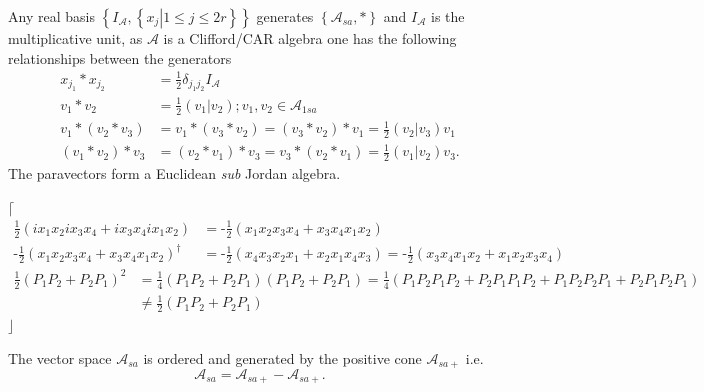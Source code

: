\documentclass[aps, preprint]{revtex4}
\begin{document}
Any real basis $\left \{I_{\mathcal{A}} ,\left \{\left .x_{j}\right \vert 1 \leq j \leq 2 r\right \}\right \}$ generates $\left \{\mathcal{A}_{s a} , \ast \right \}$ and $I_{\mathcal{A}}$ is the multiplicative unit, as $\mathcal{A}$ is a Clifford/CAR algebra one has the following relationships between the generators
\begin{align}x_{j_{1}} \ast x_{j_{2}} &  =\frac{1}{2} \delta _{j_{1} j_{2}} I_{\mathcal{A}} \\
v_{1} \ast v_{2} &  =\frac{1}{2} \left (\left .v_{1}\right \vert v_{2}\right ) ;v_{1} ,v_{2} \in \mathcal{A}_{1 s a} \\
v_{1} \ast \left (v_{2} \ast v_{3}\right ) &  =v_{1} \ast \left (v_{3} \ast v_{2}\right ) =\left (v_{3} \ast v_{2}\right ) \ast v_{1} =\frac{1}{2} \left (\left .v_{2}\right \vert v_{3}\right ) v_{1} \\
\left (v_{1} \ast v_{2}\right ) \ast v_{3} &  =\left (v_{2} \ast v_{1}\right ) \ast v_{3} =v_{3} \ast \left (v_{2} \ast v_{1}\right ) =\frac{1}{2} \left (\left .v_{1}\right \vert v_{2}\right ) v_{3}\text{.}\end{align}The paravectors form a Euclidean \emph{sub} Jordan algebra. 

$\lceil $
\begin{align}\frac{1}{2} \left (i x_{1} x_{2} i x_{3} x_{4} +i x_{3} x_{4} i x_{1} x_{2}\right ) &  =\text{-}\frac{1}{2} \left (x_{1} x_{2} x_{3} x_{4} +x_{3} x_{4} x_{1} x_{2}\right ) \\
\text{-}\frac{1}{2} \left (x_{1} x_{2} x_{3} x_{4} +x_{3} x_{4} x_{1} x_{2}\right )^{ \dag } &  =\text{-}\frac{1}{2} \left (x_{4} x_{3} x_{2} x_{1} +x_{2} x_{1} x_{4} x_{3}\right ) =\text{-}\frac{1}{2} \left (x_{3} x_{4} x_{1} x_{2} +x_{1} x_{2} x_{3} x_{4}\right )\end{align}
\begin{align}\frac{1}{2} \left (P_{1} P_{2} +P_{2} P_{1}\right )^{2} &  =\frac{1}{4} \left (P_{1} P_{2} +P_{2} P_{1}\right ) \left (P_{1} P_{2} +P_{2} P_{1}\right ) =\frac{1}{4} \left (P_{1} P_{2} P_{1} P_{2} +P_{2} P_{1} P_{1} P_{2} +P_{1} P_{2} P_{2} P_{1} +P_{2} P_{1} P_{2} P_{1}\right ) \\
 &  \neq \frac{1}{2} \left (P_{1} P_{2} +P_{2} P_{1}\right )\end{align}$\rfloor $ 

The vector space $\mathcal{A}_{s a}$ is ordered and generated by the positive cone $\mathcal{A}_{s a +}$ i.e.
\begin{equation}\mathcal{A}_{s a} =\mathcal{A}_{s a +} -\mathcal{A}_{s a +}\text{.}
\end{equation}
\end{document}

